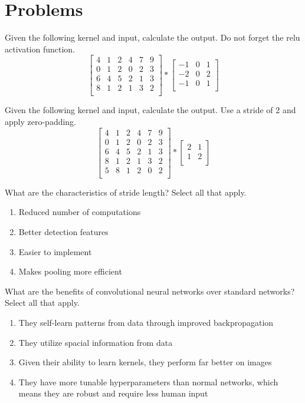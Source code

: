 \documentclass{exam}
\begin{document}
\section{Problems}
\begin{questions}

\question[4] Given the following kernel and input, calculate the output. Do not forget the relu activation function.
\[
\begin{bmatrix}
    4 & 1 & 2 & 4 & 7 & 9\\
    0 & 1 & 2 & 0 & 2 & 3\\
    6 & 4 & 5 & 2 & 1 & 3\\
    8 & 1 & 2 & 1 & 3 & 2\\
\end{bmatrix}
 *
\begin{bmatrix}
    -1 & 0 & 1\\
    -2 & 0 & 2\\
    -1 & 0 & 1\\
\end{bmatrix}
\]

\question[4] Given the following kernel and input, calculate the output. Use a stride of 2 and apply zero-padding.
\[
\begin{bmatrix}
    4 & 1 & 2 & 4 & 7 & 9\\
    0 & 1 & 2 & 0 & 2 & 3\\
    6 & 4 & 5 & 2 & 1 & 3\\
    8 & 1 & 2 & 1 & 3 & 2\\
    5 & 8 & 1 & 2 & 0 & 2\\
\end{bmatrix}
 *
\begin{bmatrix}
    2 & 1\\
    1 & 2\\
\end{bmatrix}
\]

\question[2] What are the characteristics of stride length? Select all that apply.
\begin{enumerate}
\item Reduced number of computations
\item Better detection features
\item Easier to implement
\item Makes pooling more efficient
\end{enumerate}

\question[2] What are the benefits of convolutional neural networks over standard networks? Select all that apply.
\begin{enumerate}
\item They self-learn patterns from data through improved backpropagation
\item They utilize spacial information from data
\item Given their ability to learn kernels, they perform far better on images
\item They have more tunable hyperparameters than normal networks, which means they are robust and require less human input
\end{enumerate}

\end{questions}
\end{document}

